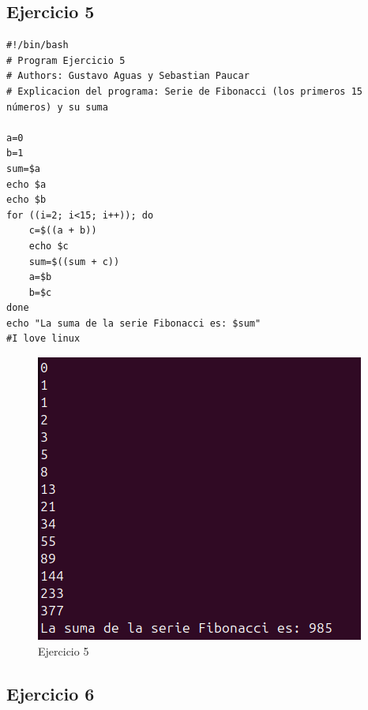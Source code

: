 \documentclass[11pt,twoside]{book}
\begin{document}
\subsection{Ejercicio 5}
\begin{lstlisting}
#!/bin/bash
# Program Ejercicio 5
# Authors: Gustavo Aguas y Sebastian Paucar
# Explicacion del programa: Serie de Fibonacci (los primeros 15 números) y su suma

a=0
b=1
sum=$a
echo $a
echo $b
for ((i=2; i<15; i++)); do
    c=$((a + b))
    echo $c
    sum=$((sum + c))
    a=$b
    b=$c
done
echo "La suma de la serie Fibonacci es: $sum"
#I love linux
\end{lstlisting}
\begin{figure}[h]
    \centering
    \includegraphics[width=0.75\linewidth]{series/ej5.png}
    \caption{Ejercicio 5}
\end{figure}
\newpage
\subsection{Ejercicio 6}
\end{document}
